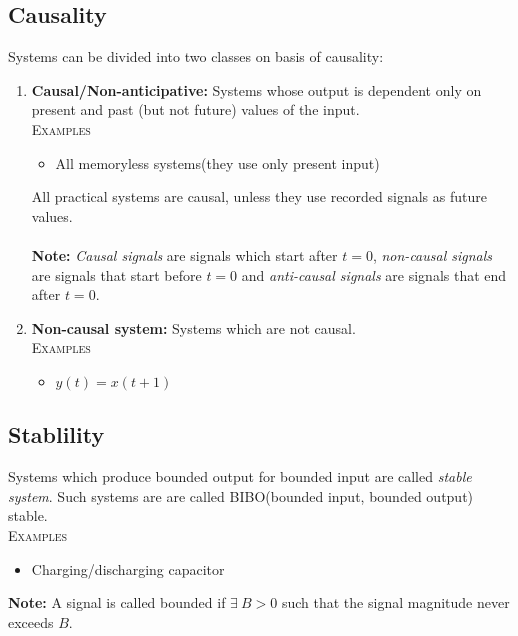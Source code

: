 \documentclass[oneside]{book}
\begin{document}
\subsection{Causality}
Systems can be divided into two classes on basis of causality:
\begin{enumerate}
	\item \textbf{Causal/Non-anticipative:} Systems whose output is dependent only on present and past (but not future) values of the input.\\
	      \textsc{Examples}
	      \begin{itemize}
		      \item All memoryless systems(they use only present input)
	      \end{itemize}
	      All practical systems are causal, unless they use recorded signals as future values.\\\\
	      \noindent\textbf{Note: } \textit{Causal signals} are signals which start after $t=0$, \textit{non-causal signals} are signals that start before $t=0$ and \textit{anti-causal signals} are signals that end after $t=0$.
	\item \textbf{Non-causal system:} Systems which are not causal.\\
	      \textsc{Examples}
	      \begin{itemize}
		      \item \(y(t) = x(t+1)\)
	      \end{itemize}
\end{enumerate}

\subsection{Stablility}
Systems which produce bounded output for bounded input are called \textit{stable system}. Such systems are are called BIBO(bounded input, bounded output) stable.\\
\textsc{Examples}
\begin{itemize}
	\item Charging/discharging capacitor
\end{itemize}
\noindent\textbf{Note: } A signal is called bounded if \(\exists\ B > 0\) such that the signal magnitude never exceeds \(B\). \cite{bibo_stability_wiki}
\end{document}
